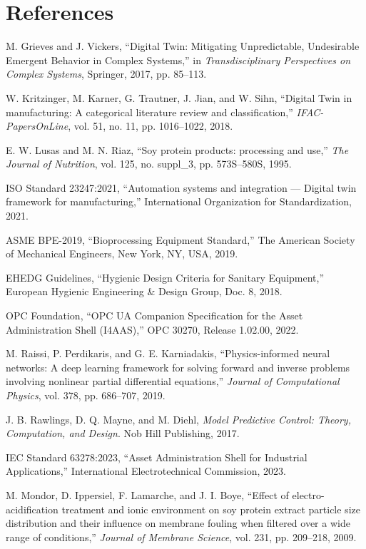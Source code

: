 \documentclass[10pt,letterpaper,twocolumn]{article}
\begin{document}
\section*{References}
\begin{enumerate}[label={[\arabic*]}, leftmargin=*]
    \item M. Grieves and J. Vickers, ``Digital Twin: Mitigating Unpredictable, Undesirable Emergent Behavior in Complex Systems,'' in \textit{Transdisciplinary Perspectives on Complex Systems}, Springer, 2017, pp. 85--113.
    \item W. Kritzinger, M. Karner, G. Trautner, J. Jian, and W. Sihn, ``Digital Twin in manufacturing: A categorical literature review and classification,'' \textit{IFAC-PapersOnLine}, vol. 51, no. 11, pp. 1016--1022, 2018.
    \item E. W. Lusas and M. N. Riaz, ``Soy protein products: processing and use,'' \textit{The Journal of Nutrition}, vol. 125, no. suppl\_3, pp. 573S--580S, 1995.
    \item ISO Standard 23247:2021, ``Automation systems and integration --- Digital twin framework for manufacturing,'' International Organization for Standardization, 2021.
    \item ASME BPE-2019, ``Bioprocessing Equipment Standard,'' The American Society of Mechanical Engineers, New York, NY, USA, 2019.
    \item EHEDG Guidelines, ``Hygienic Design Criteria for Sanitary Equipment,'' European Hygienic Engineering \& Design Group, Doc. 8, 2018.
    \item OPC Foundation, ``OPC UA Companion Specification for the Asset Administration Shell (I4AAS),'' OPC 30270, Release 1.02.00, 2022.
    \item M. Raissi, P. Perdikaris, and G. E. Karniadakis, ``Physics-informed neural networks: A deep learning framework for solving forward and inverse problems involving nonlinear partial differential equations,'' \textit{Journal of Computational Physics}, vol. 378, pp. 686--707, 2019.
    \item J. B. Rawlings, D. Q. Mayne, and M. Diehl, \textit{Model Predictive Control: Theory, Computation, and Design}. Nob Hill Publishing, 2017.
    \item IEC Standard 63278:2023, ``Asset Administration Shell for Industrial Applications,'' International Electrotechnical Commission, 2023.
    \item M. Mondor, D. Ippersiel, F. Lamarche, and J. I. Boye, ``Effect of electro-acidification treatment and ionic environment on soy protein extract particle size distribution and their influence on membrane fouling when filtered over a wide range of conditions,'' \textit{Journal of Membrane Science}, vol. 231, pp. 209--218, 2009.

\end{enumerate}
\end{document}
